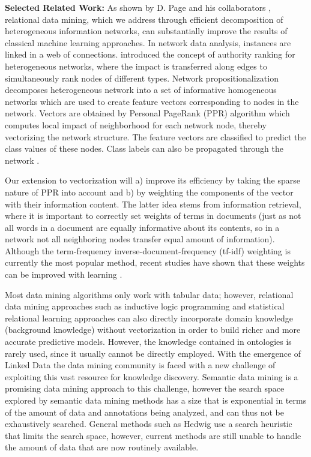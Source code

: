 \documentclass[a4paper,11pt]{article}
\begin{document}
\textbf{Selected Related Work:}
As shown by D. Page and his collaborators \citep{PageDavid:2012:RelationalLearning,Peissig2014}, relational data mining, which we address through efficient decomposition of heterogeneous information networks, can substantially improve the results of classical machine learning approaches.
In network data analysis, instances are linked in a web of connections.  \citet{thebook} introduced the concept of authority ranking for heterogeneous networks, where the impact is transferred along edges to simultaneously rank nodes of different types.
Network propositionalization \citep{grcar2012} decomposes heterogeneous network into a set of informative homogeneous networks which are used to create feature vectors corresponding to nodes in the network. Vectors are obtained by  Personal PageRank (PPR) algorithm which computes local impact of neighborhood for each network node, thereby vectorizing the network structure. The feature vectors are classified to predict the class values of these nodes. Class labels can also be propagated through the network \citep{vanunu2010}.

Our extension to vectorization will a) improve its efficiency by taking the sparse nature of PPR  into account and b) by weighting the components of the vector with their information content. The latter idea stems from information retrieval, where it is important to correctly set weights of  terms in documents (just as not all words in a document are equally informative about its contents, so in a network not all neighboring nodes transfer equal amount of information). Although the term-frequency inverse-document-frequency (tf-idf) weighting is currently the most popular method, recent studies have shown that these weights can be improved with learning \citep{Kim2016}. 

Most data mining algorithms only work with tabular data; however, relational data mining  approaches such as inductive logic programming and statistical relational learning approaches \citep{PageDavid:2012:RelationalLearning} can also directly incorporate domain knowledge (background knowledge) without vectorization in order to build richer and more accurate predictive models. However, the knowledge contained in ontologies is rarely used, since it usually cannot be directly employed. With the  emergence of Linked Data \citep{Bizer2009} the data mining community is faced with a new challenge of exploiting this vast resource for knowledge discovery. Semantic data mining  
is a promising data mining approach to this challenge, however the search space explored by semantic data mining methods has a size that is exponential in terms of the amount of data and annotations being analyzed, and can thus not be exhaustively searched. General methods such as Hedwig \citep{Vavpetic2013} use a search heuristic that limits the search space, however, current methods are still unable to handle the amount of data that are now routinely available.
\end{document}

